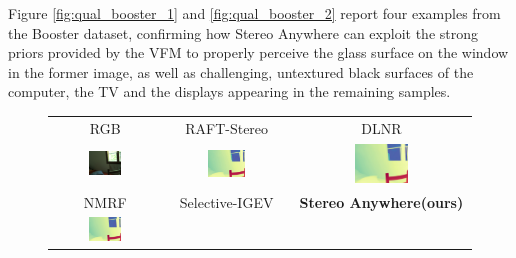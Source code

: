 \documentclass[10pt,twocolumn,letterpaper]{article}
\newcommand{\method}[0]{Stereo Anywhere\xspace}
\begin{document}
\clearpage

Figure \ref{fig:qual_booster_1} and \ref{fig:qual_booster_2} report four examples from the Booster dataset, confirming how \method can exploit the strong priors provided by the VFM to properly perceive the glass surface on the window in the former image, as well as challenging, untextured black surfaces of the computer, the TV and the displays appearing in the remaining samples.

\begin{figure}[h]
    \centering
    \renewcommand{\tabcolsep}{1pt}
    \begin{tabular}{ccc}
        \small RGB &
        \small RAFT-Stereo \cite{lipson2021raft} &
        \small DLNR \cite{zhao2023high} \\
        \includegraphics[width=0.32\textwidth]{imgs/booster/rgb/1.jpg} &
        \includegraphics[width=0.32\textwidth]{imgs/booster/stereo/RAFT-Stereo/1.jpg} &
        \includegraphics[width=0.32\textwidth]{imgs/booster/stereo/DLNR/1.jpg} \\
        \small NMRF \cite{guan2024neural} &
        \small Selective-IGEV \cite{wang2024selective} &
        \textbf{\method (ours)} \\
        \includegraphics[width=0.32\textwidth]{imgs/booster/stereo/NMRF/1.jpg} &

\end{tabular}
\end{figure}
\end{document}
